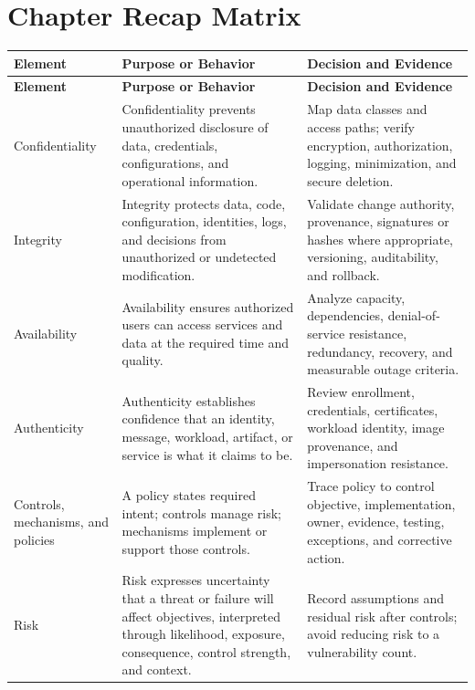 \documentclass[11pt]{article}
\begin{document}
\section{Chapter Recap Matrix}
\begingroup\small\setlength{\tabcolsep}{4pt}
\begin{longtable}{@{}>{\RaggedRight\arraybackslash}p{}>{\RaggedRight\arraybackslash}p{}>{\RaggedRight\arraybackslash}p{}@{}}
\toprule\rowcolor{Navy}\color{white}\textbf{Element} & \color{white}\textbf{Purpose or Behavior} & \color{white}\textbf{Decision and Evidence}\\\midrule\endfirsthead
\toprule\rowcolor{Navy}\color{white}\textbf{Element} & \color{white}\textbf{Purpose or Behavior} & \color{white}\textbf{Decision and Evidence}\\\midrule\endhead
Confidentiality & Confidentiality prevents unauthorized disclosure of data, credentials, configurations, and operational information. & Map data classes and access paths; verify encryption, authorization, logging, minimization, and secure deletion. \\\midrule
Integrity & Integrity protects data, code, configuration, identities, logs, and decisions from unauthorized or undetected modification. & Validate change authority, provenance, signatures or hashes where appropriate, versioning, auditability, and rollback. \\\midrule
Availability & Availability ensures authorized users can access services and data at the required time and quality. & Analyze capacity, dependencies, denial-of-service resistance, redundancy, recovery, and measurable outage criteria. \\\midrule
Authenticity & Authenticity establishes confidence that an identity, message, workload, artifact, or service is what it claims to be. & Review enrollment, credentials, certificates, workload identity, image provenance, and impersonation resistance. \\\midrule
Controls, mechanisms, and policies & A policy states required intent; controls manage risk; mechanisms implement or support those controls. & Trace policy to control objective, implementation, owner, evidence, testing, exceptions, and corrective action. \\\midrule
Risk & Risk expresses uncertainty that a threat or failure will affect objectives, interpreted through likelihood, exposure, consequence, control strength, and context. & Record assumptions and residual risk after controls; avoid reducing risk to a vulnerability count. \\\midrule

\end{longtable}
\end{document}
